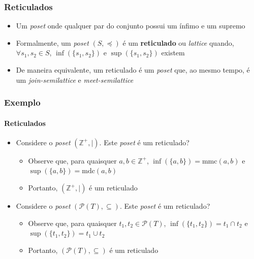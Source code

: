\documentclass[12pt]{beamer}
\begin{document}
\begin{frame}
  \frametitle{Reticulados}
  \begin{itemize}
    \item Um \emph{poset} onde qualquer par do conjunto possui um ínfimo e um
        supremo
    \item Formalmente, um \emph{poset} $(S, \preccurlyeq)$ é um
        \textbf{reticulado} ou \emph{lattice} quando, $\forall s_1, s_2 \in S$,
          $\inf(\{s_1, s_2\})$ e $\sup(\{s_1, s_2\})$ existem
    \item De maneira equivalente, um reticulado é um \emph{poset} que, ao
        mesmo tempo, é um \emph{join-semilattice} e \emph{meet-semilattice}
  \end{itemize}
\end{frame}

\begin{frame}
  \frametitle{Exemplo}
  \framesubtitle{Reticulados}
  \begin{itemize}
    \item<1-> Considere o \emph{poset} $(\mathbb{Z}^{+}, \mid)$. Este
        \emph{poset} é um reticulado?
    \begin{itemize}[itemsep=0pt]
      \item<2-> Observe que, para quaisquer $a, b \in \mathbb{Z}^{+}$,
          $\inf(\{a, b\}) = \text{mmc}(a, b)$ e $\sup(\{a, b\}) = \text{mdc}(a,
            b)$
      \item<2-> Portanto, $(\mathbb{Z}^{+}, \mid)$ é um reticulado
    \end{itemize}
    \item<3-> Considere o \emph{poset} $(\mathcal{P}(T), \subseteq)$. Este
        \emph{poset} é um reticulado?
    \begin{itemize}[itemsep=0pt]
      \item<4-> Observe que, para quaisquer $t_1, t_2 \in \mathcal{P}(T)$,
          $\inf(\{t_1, t_2\}) = t_1 \cap t_2$ e $\sup(\{t_1, t_2\}) = t_1 \cup
            t_2$
      \item<4-> Portanto, $(\mathcal{P}(T), \subseteq)$ é um reticulado
    \end{itemize}
  \end{itemize}
\end{frame}
\end{document}
